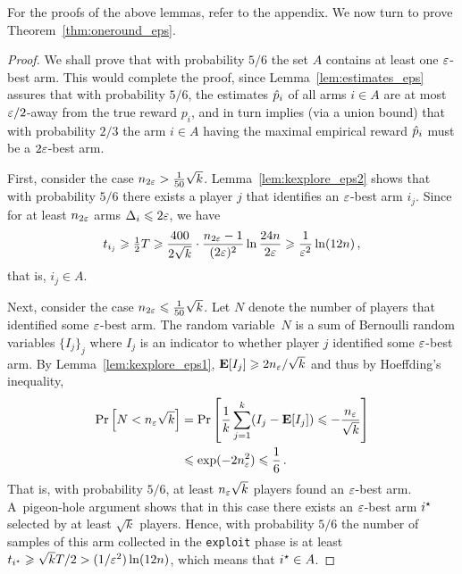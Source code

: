 For the proofs of the above lemmas, refer to the appendix.
We now turn to prove Theorem~\ref{thm:oneround_eps}.



\begin{proof}
We shall prove that with probability $5/6$ the set $A$ contains at least one $\varepsilon$-best arm.
This would complete the proof, since Lemma~\ref{lem:estimates_eps} assures that with probability $5/6$, the estimates $\hat{p}_i$ of all arms $i \in A$ are at most $\varepsilon/2$-away from the true reward $p_i$, and in turn implies (via a union bound) that with probability $2/3$ the arm $i \in A$ having the maximal empirical reward $\hat{p}_i$ must be a $2\varepsilon$-best arm.

First, consider the case $n_{2\varepsilon} > \tfrac{1}{50}\sqrt{k}$. Lemma~\ref{lem:kexplore_eps2} shows that with probability $5/6$ there exists a player $j$ that identifies an $\varepsilon$-best arm $i_j$.
Since for at least $n_{2\varepsilon}$ arms $\Delta_i \leqslant 2\varepsilon$, we have
\begin{align*}
	t_{i_j} 
	\geqslant \tfrac{1}{2} T
	\geqslant \frac{400}{2\sqrt{k}} \cdot \frac{n_{2\varepsilon}-1}{(2\varepsilon)^2} \ln \frac {24n}{2\varepsilon}
	\geqslant \frac{1}{\varepsilon^2} \ln (12n) \,,
\end{align*}
that is, $i_j \in A$.

Next, consider the case $n_{2\varepsilon} \leqslant \tfrac{1}{50}\sqrt{k}$.
Let $N$ denote the number of players that identified some $\varepsilon$-best arm.
The random variable~$N$ is a sum of Bernoulli random variables $\{I_j\}_j$ where $I_j$ is an indicator to whether player $j$ identified some $\varepsilon$-best arm. By Lemma~\ref{lem:kexplore_eps1}, $\mathbf{E}[I_j]\geqslant 2 n_{\varepsilon} / \sqrt{k}$ and thus by Hoeffding's inequality,
\begin{align*}
	\Pr\left[N < n_{\varepsilon} \sqrt{k}\right] 
	&= \Pr\left[ \frac{1}{k} \sum_{j=1}^k (I_j-\mathbf{E}[I_j]) \leqslant -\frac{n_\varepsilon}{\sqrt{k}} \right] \\
	&\leqslant \exp(-2 n_{\varepsilon}^2)
	\leqslant \frac{1}{6} \,.
\end{align*}
That is, with probability $5/6$, at least $n_{\varepsilon} \sqrt{k}$ players found an $\varepsilon$-best arm. 
A~pigeon-hole argument shows that in this case there exists an $\varepsilon$-best arm $i^\star$ selected by at least $\sqrt{k}$ players.
Hence, with probability $5/6$ the number of samples of this arm collected in the \texttt{exploit} phase is at least $t_{i^\star} \geqslant \sqrt{k} T/2 > (1/\varepsilon^2) \ln(12n)$, which means that $i^\star \in A$.
\end{proof}

